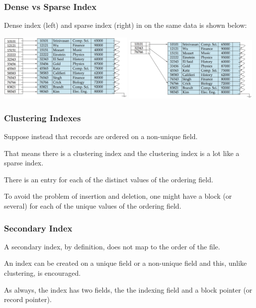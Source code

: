\begin{frame}
\frametitle{Dense vs Sparse Index}
Dense index (left) and sparse index (right) in on the same data is shown below:

\begin{center}
\includegraphics[width=0.49\textwidth]{images/dense-index}
\includegraphics[width=0.49\textwidth]{images/sparse-index}
\end{center}

\end{frame}


\begin{frame}
\frametitle{Clustering Indexes}

Suppose instead that records are ordered on a non-unique field. 

That means there is a clustering index and the clustering index is a lot like a sparse index. 

There is an entry for each of the distinct values of the ordering field. 

To avoid the problem of insertion and deletion, one might have a block (or several) for each of the unique values of the ordering field.


\end{frame}

\begin{frame}
\frametitle{Secondary Index}

A secondary index, by definition, does not map to the order of the file. 

An index can be created on a unique field or a non-unique field and this, unlike clustering, is encouraged. 

As always, the index has two fields, the the indexing field and a block pointer (or record pointer). 

\end{frame}

